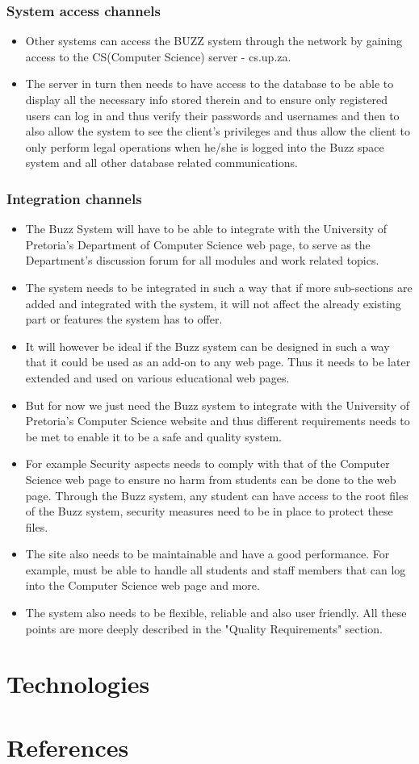 \documentclass[a4paper]{article}
\begin{document}
\subsubsection{System access channels }

\begin{itemize}
\item Other systems can access the BUZZ system through the network by gaining access to the  CS(Computer Science) server - cs.up.za. 
\item The server in turn then needs to have access to the database to be able to display all the necessary info stored therein and to ensure only registered users can log in and thus verify their passwords and usernames and then to also allow the system to see the client's privileges and thus allow the client to only perform legal operations when he/she is logged into the Buzz space system and all other database related communications. 
\end{itemize}

\subsubsection{Integration channels }
\begin{itemize}
\item The Buzz System will have to be able to integrate with the University of Pretoria's Department of Computer Science web page, to serve as the Department's discussion forum for all modules and work related topics.  
\item The system needs to be integrated in such a way that if more sub-sections are added and integrated with the system, it will not affect the already existing part or features the system has to offer. 
\item It will however be ideal if the Buzz system can be designed in such a way that it could be used as an add-on to any web page. Thus it needs to be later extended and used on various educational web pages.
\item But for now we just need the Buzz system to integrate with the  University of Pretoria's Computer Science website and thus different requirements needs to be met to enable it to be a safe and quality system. 
\item For example Security aspects needs to comply with that of the Computer Science web page to ensure no harm from students can be done to the web page. Through the Buzz system, any student can have access to the root files of the Buzz system, security measures need to be in place to protect these files.
\item The site also needs to be maintainable and  have a good performance. For example, must be able to handle all students and staff members that can log into the Computer Science web page and more.
\item The system also needs to be flexible, reliable and also user friendly. All these points are more deeply described in the "Quality Requirements" section.
\end{itemize}

\section{Technologies}

\section{References}
\end{document}
